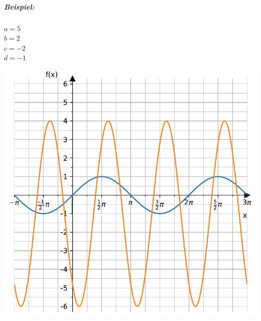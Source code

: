 \documentclass[
  11pt,
  a4paper,
  DIV=11,
  numbers=noendperiod]{scrartcl}
\let\oldsubparagraph\subparagraph
\renewcommand{\subparagraph}[1]{\oldsubparagraph{#1}\mbox{}}
\begin{document}
\subparagraph{Beispiel:}\label{beispiel-3}

\(a=5\)\\
\(b=2\)\\
\(c=-2\)\\
\(d=-1\)

\includegraphics{7_Trigonometrische_Funktionen_files/figure-pdf/cell-18-output-1.pdf}
\end{document}
